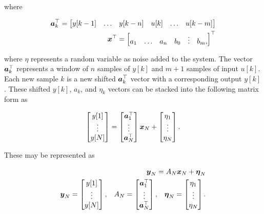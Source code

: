 where

\begin{align}
    \boldsymbol{a}_k^\top =
    \begin{bmatrix}
        y[k-1] & \hdots & y[k-n] & u[k] & \hdots & u[k-m]
    \end{bmatrix}\\
    \boldsymbol{x}^\top =
    \begin{bmatrix}
        a_1 & \hdots & a_n & b_0 & \vdots & b_m,
    \end{bmatrix}^\top
\end{align}

where $\eta$ represents a random variable as noise added to the system. 
The vector $\boldsymbol{a}_k^\top$ represents a window of $n$ samples of $y[k]$ and $m+1$ samples of input $u[k]$. 
Each new sample $k$ is a new shifted $\boldsymbol{a}_k^\top$ vector with a corresponding output $y[k]$. 
These shifted $y[k]$, $a_k$, and $\eta_k$ vectors can be stacked into the following matrix form as

\begin{align}
    \begin{bmatrix}
        y[1]\\
        \vdots\\
        y[N]\\
    \end{bmatrix}
    =
    \begin{bmatrix}
        \boldsymbol{a}_1^\top\\
        \vdots\\
        \boldsymbol{a}_N^\top\\
    \end{bmatrix}
    \boldsymbol{x}_N
    +
    \begin{bmatrix}
        \eta_1\\
        \vdots\\
        \eta_N
    \end{bmatrix}.
\end{align}

These may be represented as

\begin{align*}
    \boldsymbol{y}_N = A_N \boldsymbol{x}_N + \boldsymbol{\eta}_N\\
    \boldsymbol{y}_N =
    \begin{bmatrix}
        y[1]\\
        \vdots\\
        y[N]\\
    \end{bmatrix}
    \text{,}
    \quad
    A_N =
    \begin{bmatrix}
        \boldsymbol{a}_1^\top\\
        \vdots\\
        \boldsymbol{a}_N^\top\\
    \end{bmatrix}
    \text{,}
    \quad
    \boldsymbol{\eta}_N =
    \begin{bmatrix}
        \eta_1\\
        \vdots\\
        \eta_N\\
    \end{bmatrix}.
\end{align*}

